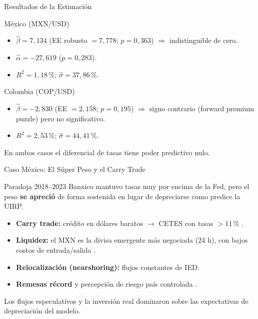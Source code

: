 \documentclass[10pt,professionalfonts,aspectratio=169]{beamer}
\begin{document}
\begin{frame}{Resultados de la Estimación}
    \begin{block}{México (MXN/USD)}
        \begin{itemize}
            \item $\hat{\beta} = 7{,}134$ \; (EE robusto $= 7{,}778$; $p = 0{,}363$) $\Rightarrow$ indistinguible de cero.
            \item $\hat{\alpha} = -27{,}619$ \; ($p = 0{,}283$).
            \item $R^2 = 1{,}18$\,\%; \; $\hat{\sigma} = 37{,}86$\,\%.
        \end{itemize}
    \end{block}

    \begin{block}{Colombia (COP/USD)}
        \begin{itemize}
            \item $\hat{\beta} = -2{,}830$ \; (EE $= 2{,}158$; $p = 0{,}195$) $\Rightarrow$ signo contrario (forward premium puzzle) pero no significativo.
            \item $R^2 = 2{,}53$\,\%; \; $\hat{\sigma} = 44{,}41$\,\%.
        \end{itemize}
    \end{block}

    \footnotesize En ambos casos el diferencial de tasas tiene poder predictivo nulo.
\end{frame}

\begin{frame}{Caso México: El Súper Peso y el Carry Trade}
    \begin{block}{Paradoja 2018--2023}
        Banxico mantuvo tasas muy por encima de la Fed, pero el peso \textbf{se apreció} de forma sostenida en lugar de depreciarse como predice la UIRP.
    \end{block}

    \begin{itemize}
        \item \textbf{Carry trade:} crédito en dólares baratos $\to$ CETES con tasas $> 11$\,\% \parencite{banxico2024}.
        \item \textbf{Liquidez:} el MXN es la divisa emergente más negociada (24 h), con bajos costos de entrada/salida \parencite{imf2023}.
        \item \textbf{Relocalización (nearshoring):} flujos constantes de IED.
        \item \textbf{Remesas récord} y percepción de riesgo país controlada \parencite{benavides2016,imf2023}.
    \end{itemize}

    \vspace{0.2cm}
    \footnotesize Los flujos especulativos y la inversión real dominaron sobre las expectativas de depreciación del modelo.
\end{frame}
\end{document}
